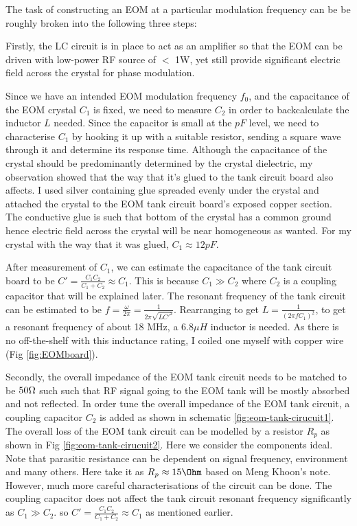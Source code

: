 \documentclass[12pt]{report}
\begin{document}
The task of constructing an EOM at a particular modulation frequency can be be roughly broken into the following three steps:
\par
Firstly, the LC circuit is in place to act as an amplifier so that the EOM can be driven with low-power RF source of $<$ 1W, yet still provide significant electric field across the crystal for phase modulation. 
\par
Since we have an intended EOM modulation frequency $f_0$, and the capacitance of the EOM crystal $C_1$ is fixed, we need to measure $C_2$ in order to backcalculate the inductor $L$ needed. Since the capacitor is small at the $pF$ level, we need to characterise $C_1$ by hooking it up with a suitable resistor, sending a square wave through it and determine its response time. Although the capacitance of the crystal should be predominantly determined by the crystal dielectric, my observation showed that the way that it's glued to the tank circuit board also affects. I used silver containing glue spreaded evenly under the crystal and attached the crystal to the EOM tank circuit board's exposed copper section. The conductive glue is such that bottom of the crystal has a common ground hence electric field across the crystal will be near homogeneous as wanted. For my crystal with the way that it was glued, $C_1 \approx 12 pF$.
\par
After measurement of $C_1$, we can estimate the capacitance of the tank circuit board to be $C' = \frac{C_1C_2}{C_1+C_2} \approx C_1$. This is because $C_1 \gg C_2$ where $C_2$ is a coupling capacitor that will be explained later. The resonant frequency of the tank circuit can be estimated to be $f = \frac{\omega}{2\pi} = \frac{1}{2\pi\sqrt{LC'^2}}$. Rearranging to get $L = \frac{1}{(2\pi f C_1)^2}$, to get a resonant frequency of about 18 MHz, a $6.8 \mu H$ inductor is needed. As there is no off-the-shelf with this inductance rating, I coiled one myself with copper wire (Fig \ref{fig:EOMboard}).
\par
Secondly, the overall impedance of the EOM tank circuit needs to be matched to be $50\ohm$ such such that RF signal going to the EOM tank will be mostly absorbed and not reflected. In order tune the overall impedance of the EOM tank circuit, a coupling capacitor $C_2$ is added as shown in schematic \ref{fig:eom-tank-cirucuit1}. The overall loss of the EOM tank circuit can be modelled by a resistor $R_p$ as shown in Fig \ref{fig:eom-tank-cirucuit2}. Here we consider the components ideal. Note that parasitic resistance can be dependent on signal frequency, environment and many others. Here take it as $ R_p \approx 15 \Ohm$ based on Meng Khoon's note. However, much more careful characterisations of the circuit can be done. The coupling capacitor does not affect the tank circuit resonant frequency significantly as $C_1 \gg C_2$. so $C' = \frac{C_1C_2}{C_1+C_2} \approx C_1$ as mentioned earlier.  
\end{document}
